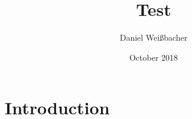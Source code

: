 \documentclass{book}
\title{Test}
\author{Daniel Weißbacher}
\date{October 2018}
\begin{document}
\maketitle
\part{Introduction}
\end{document}
